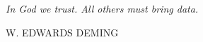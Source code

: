 \documentclass[14pt, svgnames, openany]{memoir}
\begin{document}

\clearpage
\thispagestyle{empty}
\null\vfill

\begin{center}
\parbox{\dimexpr\linewidth-2cm}{%
  \raggedright{\LARGE \itshape%
   In God we trust. All others must bring data.\par\bigskip
  }
\raggedleft\Large\MakeUppercase{W. Edwards Deming}\par%
}
\end{center}

\vfill\vfill

\clearpage

\tableofcontents



\end{document}
